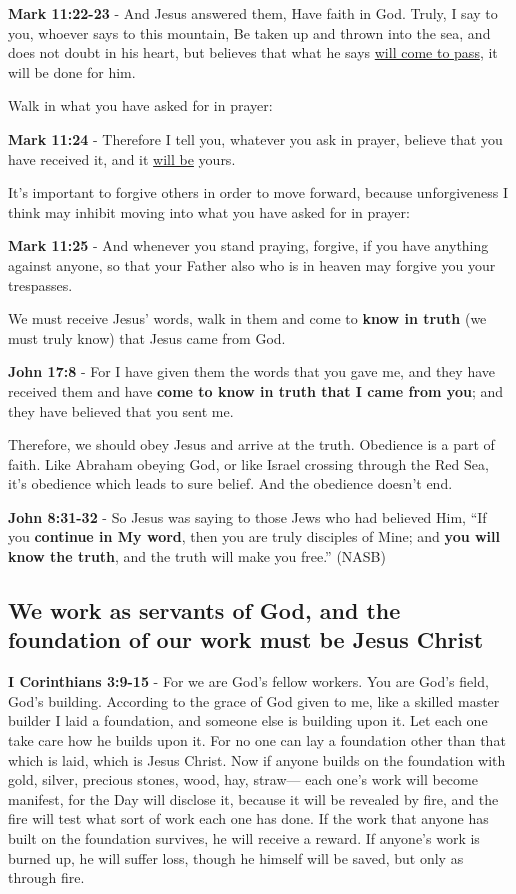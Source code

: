 \documentclass[11pt]{article}
\begin{document}
\textbf{Mark 11:22-23} - And Jesus answered them, Have faith in God. Truly, I say to you, whoever says to this mountain, Be taken up and thrown into the sea, and does not doubt in his heart, but believes that what he says \uline{will come to pass}, it will be done for him.

Walk in what you have asked for in prayer:

\textbf{Mark 11:24} - Therefore I tell you, whatever you ask in prayer, believe that you have received it, and it \uline{will be} yours.

It's important to forgive others in order to move forward, because unforgiveness I think may inhibit moving into what you have asked for in prayer:

\textbf{Mark 11:25} - And whenever you stand praying, forgive, if you have anything against anyone, so that your Father also who is in heaven may forgive you your trespasses.

We must receive Jesus' words, walk in them and come to \textbf{know in truth} (we must truly know) that Jesus came from God.

\textbf{John 17:8} - For I have given them the words that you gave me, and they have received them and have \textbf{come to know in truth that I came from you}; and they have believed that you sent me.

Therefore, we should obey Jesus and arrive at the truth. Obedience is a part of faith. Like Abraham obeying God, or like Israel crossing through the Red Sea, it's obedience which leads to sure belief.
And the obedience doesn't end.

\textbf{John 8:31-32} - So Jesus was saying to those Jews who had believed Him, “If you \textbf{continue in My word}, then you are truly disciples of Mine; and \textbf{you will know the truth}, and the truth will make you free.” (NASB)

\subsection{We work as servants of God, and the foundation of our work must be Jesus Christ}
\label{sec:orge60d6ec}
\textbf{I Corinthians 3:9-15} - For we are God's fellow workers. You are God's field, God's building.  According to the grace of God given to me, like a skilled master builder I laid a foundation, and someone else is building upon it. Let each one take care how he builds upon it.  For no one can lay a foundation other than that which is laid, which is Jesus Christ.  Now if anyone builds on the foundation with gold, silver, precious stones, wood, hay, straw— each one's work will become manifest, for the Day will disclose it, because it will be revealed by fire, and the fire will test what sort of work each one has done.  If the work that anyone has built on the foundation survives, he will receive a reward.  If anyone's work is burned up, he will suffer loss, though he himself will be saved, but only as through fire.
\end{document}
